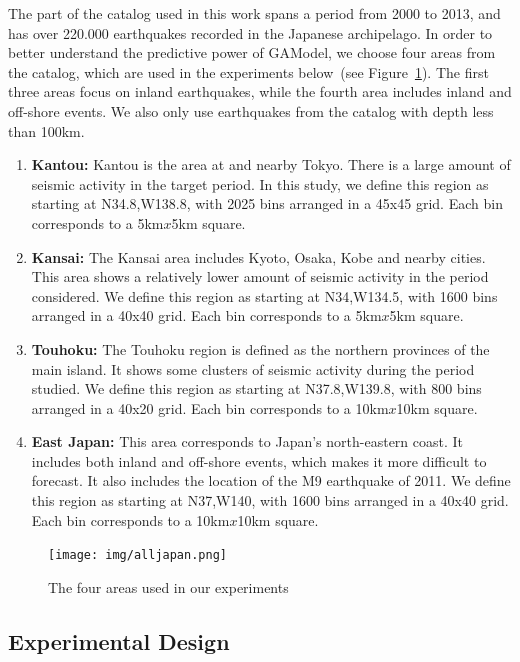 \documentclass{sig-alternate}
\begin{document}
The part of the catalog used in this work spans a period from 2000 to
2013, and has over 220.000 earthquakes recorded in the Japanese
archipelago. In order to better understand the predictive power of
GAModel, we choose four areas from the catalog, which are used in the
experiments below~(see Figure~\ref{areamap}). The first three areas
focus on inland earthquakes, while the fourth area includes inland and
off-shore events. We also only use earthquakes from the catalog with
depth less than 100km.

\begin{enumerate}
  \item {\bf Kantou:} Kantou is the area at and nearby Tokyo. There is
    a large amount of seismic activity in the target period. In this
    study, we define this region as starting at N34.8,W138.8, with
    2025 bins arranged in a 45x45 grid. Each bin corresponds to a
    5km$x$5km square.
  \item {\bf Kansai:} The Kansai area includes Kyoto, Osaka, Kobe and
    nearby cities. This area shows a relatively lower amount of
    seismic activity in the period considered. We define this region
    as starting at N34,W134.5, with 1600 bins arranged in a 40x40
    grid. Each bin corresponds to a 5km$x$5km square.
  \item {\bf Touhoku:} The Touhoku region is defined as the northern
    provinces of the main island. It shows some clusters of seismic
    activity during the period studied. We define this region as
    starting at N37.8,W139.8, with 800 bins arranged in a 40x20
    grid. Each bin corresponds to a 10km$x$10km square.
  \item {\bf East Japan:} This area corresponds to Japan's
    north-eastern coast. It includes both inland and off-shore events,
    which makes it more difficult to forecast. It also includes the
    location of the M9 earthquake of 2011. We define this region as
    starting at N37,W140, with 1600 bins arranged in a 40x40
    grid. Each bin corresponds to a 10km$x$10km square.
\end{enumerate}

\begin{figure}
  \begin{center}
  \texttt{[image: img/alljapan.png]}
  \end{center}
  \caption{The four areas used in our experiments}
  \label{areamap}
\end{figure}

\subsection{Experimental Design} %
\end{document}
